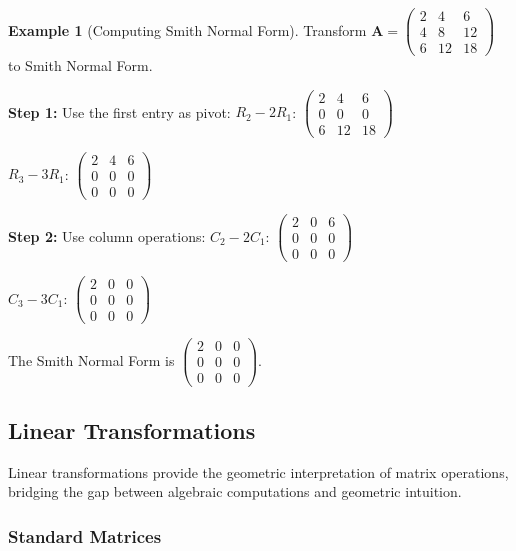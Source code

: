\documentclass[12pt]{article}
\numberwithin{equation}{section}
\newcommand{\mat}[1]{\mathbf{#1}}        %
\theoremstyle{plain}
\theoremstyle{definition}
\newtheorem{example}[theorem]{Example}
\theoremstyle{remark}
\begin{document}
\begin{example}[Computing Smith Normal Form]
Transform $\mat{A} = \begin{pmatrix} 2 & 4 & 6 \\ 4 & 8 & 12 \\ 6 & 12 & 18 \end{pmatrix}$ to Smith Normal Form.

\textbf{Step 1:} Use the first entry as pivot:
$R_2 - 2R_1$: $\begin{pmatrix} 2 & 4 & 6 \\ 0 & 0 & 0 \\ 6 & 12 & 18 \end{pmatrix}$

$R_3 - 3R_1$: $\begin{pmatrix} 2 & 4 & 6 \\ 0 & 0 & 0 \\ 0 & 0 & 0 \end{pmatrix}$

\textbf{Step 2:} Use column operations:
$C_2 - 2C_1$: $\begin{pmatrix} 2 & 0 & 6 \\ 0 & 0 & 0 \\ 0 & 0 & 0 \end{pmatrix}$

$C_3 - 3C_1$: $\begin{pmatrix} 2 & 0 & 0 \\ 0 & 0 & 0 \\ 0 & 0 & 0 \end{pmatrix}$

The Smith Normal Form is $\begin{pmatrix} 2 & 0 & 0 \\ 0 & 0 & 0 \\ 0 & 0 & 0 \end{pmatrix}$.
\end{example}

\subsection{Linear Transformations}

Linear transformations provide the geometric interpretation of matrix operations, bridging the gap between algebraic computations and geometric intuition.

\subsubsection{Standard Matrices}
\end{document}
